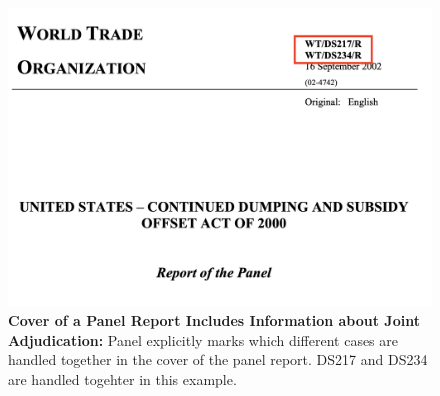 \begin{figure}[h]
    \centering
    \includegraphics[scale=0.35]{Data/pngs/linked_cases.png}
    \caption{\textbf{Cover of a Panel Report Includes Information about Joint Adjudication:}
        Panel explicitly marks which different cases are handled together in the cover of the panel report. DS217 and DS234 are handled togehter in this example.
        }
    \label{fig:linked-cases}
\end{figure}




